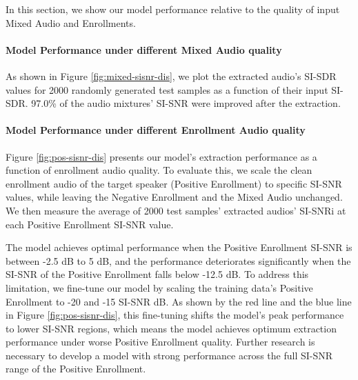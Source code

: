 In this section, we show our model performance relative to the quality of input Mixed Audio and Enrollments. 

\paragraph{Model Performance under different Mixed Audio quality} As shown in Figure \ref{fig:mixed-sisnr-dis}, we plot the extracted audio's SI-SDR values for 2000 randomly generated test samples as a function of their input SI-SDR. 97.0\% of the audio mixtures' SI-SNR were improved after the extraction.

\paragraph{Model Performance under different Enrollment Audio quality} Figure \ref{fig:pos-sisnr-dis} presents our model's extraction performance as a function of enrollment audio quality. To evaluate this, we scale the clean enrollment audio of the target speaker (Positive Enrollment) to specific SI-SNR values, while leaving the Negative Enrollment and the Mixed Audio unchanged. We then measure the average of 2000 test samples' extracted audios' SI-SNRi at each Positive Enrollment SI-SNR value.

The model achieves optimal performance when the Positive Enrollment SI-SNR is between -2.5 dB to 5 dB, and the performance deteriorates significantly when the SI-SNR of the Positive Enrollment falls below -12.5 dB. To address this limitation, we fine-tune our model by scaling the training data's Positive Enrollment to -20 and -15 SI-SNR dB. As shown by the red line and the blue line in Figure \ref{fig:pos-sisnr-dis}, this fine-tuning shifts the model's peak performance to lower SI-SNR regions, which means the model achieves optimum extraction performance under worse Positive Enrollment quality. Further research is necessary to develop a model with strong performance across the full SI-SNR range of the Positive Enrollment.


